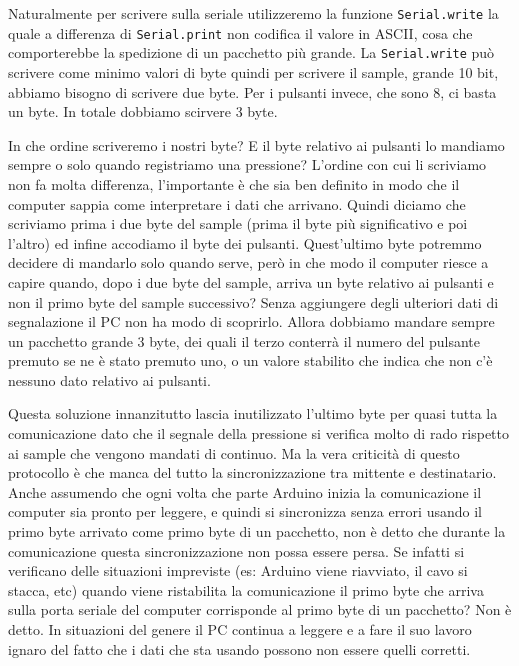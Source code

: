 \documentclass[a4paper,11pt]{article}
\begin{document}
Naturalmente per scrivere sulla seriale utilizzeremo la funzione \texttt{Serial.write} la quale a differenza di \texttt{Serial.print} non codifica il valore in ASCII, cosa che comporterebbe la spedizione di un pacchetto più grande. La \texttt{Serial.write} può scrivere come minimo valori di byte quindi per scrivere il sample, grande 10 bit, abbiamo bisogno di scrivere due byte. Per i pulsanti invece, che sono 8, ci basta un byte. In totale dobbiamo scirvere 3 byte.

In che ordine scriveremo i nostri byte? E il byte relativo ai pulsanti lo mandiamo sempre o solo quando registriamo una pressione? L'ordine con cui li scriviamo non fa molta differenza, l'importante è che sia ben definito in modo che il computer sappia come interpretare i dati che arrivano. Quindi diciamo che scriviamo prima i due byte del sample (prima il byte più significativo e poi l'altro) ed infine accodiamo il byte dei pulsanti.
Quest'ultimo byte potremmo decidere di mandarlo solo quando serve, però in che modo il computer riesce a capire quando, dopo i due byte del sample, arriva un byte relativo ai pulsanti e non il primo byte del sample successivo? Senza aggiungere degli ulteriori dati di segnalazione il PC non ha modo di scoprirlo. Allora dobbiamo mandare sempre un pacchetto grande 3 byte, dei quali il terzo conterrà il numero del pulsante premuto se ne è stato premuto uno, o un valore stabilito che indica che non c'è nessuno dato relativo ai pulsanti.
\vspace{0.2in}

Questa soluzione innanzitutto lascia inutilizzato l'ultimo byte per quasi tutta la comunicazione dato che il segnale della pressione si verifica molto di rado rispetto ai sample che vengono mandati di continuo. Ma la vera criticità di questo protocollo è che manca del tutto la sincronizzazione tra mittente e destinatario. Anche assumendo che ogni volta che parte Arduino inizia la comunicazione il computer sia pronto per leggere, e quindi si sincronizza senza errori usando il primo byte arrivato come primo byte di un pacchetto, non è detto che durante la comunicazione questa sincronizzazione non possa essere persa. Se infatti si verificano delle situazioni impreviste (es: Arduino viene riavviato, il cavo si stacca, etc) quando viene ristabilita la comunicazione il primo byte che arriva sulla porta seriale del computer corrisponde al primo byte di un pacchetto? Non è detto. In situazioni del genere il PC continua a leggere e a fare il suo lavoro ignaro del fatto che i dati che sta usando possono non essere quelli corretti.
\end{document}
